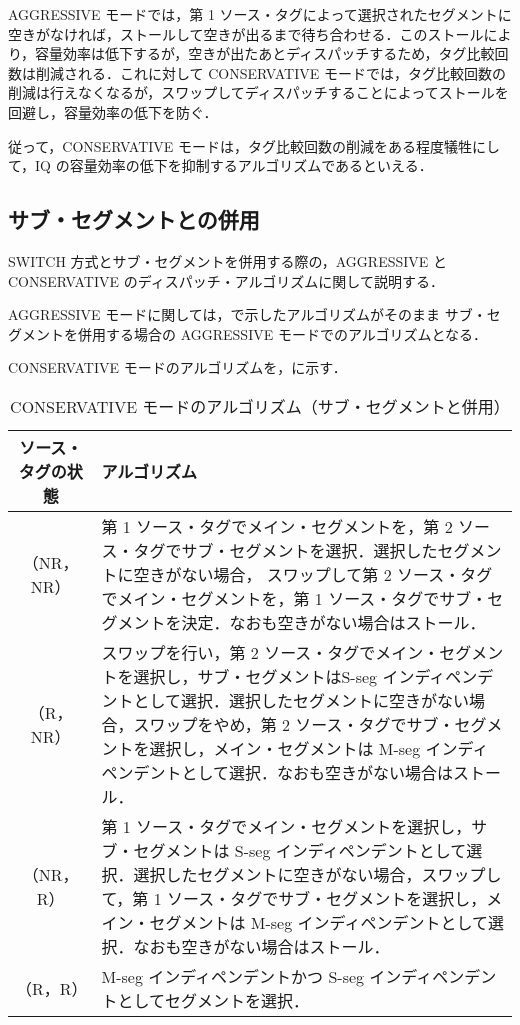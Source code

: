 AGGRESSIVE モードでは，第 1 ソース・タグによって選択されたセグメントに空きがなければ，ストールして空きが出るまで待ち合わせる．このストールにより，容量効率は低下するが，空きが出たあとディスパッチするため，タグ比較回数は削減される．これに対して CONSERVATIVE モードでは，タグ比較回数の削減は行えなくなるが，スワップしてディスパッチすることによってストールを回避し，容量効率の低下を防ぐ．

従って，CONSERVATIVE モードは，タグ比較回数の削減をある程度犠牲にして，IQ の容量効率の低下を抑制するアルゴリズムであるといえる．

\subsection{サブ・セグメントとの併用}
SWITCH 方式とサブ・セグメントを併用する際の，AGGRESSIVE と CONSERVATIVE のディスパッチ・アルゴリズムに関して説明する．

AGGRESSIVE モードに関しては，で示したアルゴリズムがそのまま サブ・セグメントを併用する場合の AGGRESSIVE モードでのアルゴリズムとなる．

CONSERVATIVE モードのアルゴリズムを，に示す．
\begin{table}[htb]
  \caption{CONSERVATIVE モードのアルゴリズム（サブ・セグメントと併用）}
  \footnotesize
  \center
   \begin{tabular}{|c|p{13.5cm}|} \hline \hline
    ソース・タグの状態 & アルゴリズム \\ \hline
    （NR，NR） & 第 1 ソース・タグでメイン・セグメントを，第 2 ソース・タグでサブ・セグメントを選択．選択したセグメントに空きがない場合， スワップして第 2 ソース・タグでメイン・セグメントを，第 1 ソース・タグでサブ・セグメントを決定．なおも空きがない場合はストール． \\ \hline
    （R，NR） & スワップを行い，第 2 ソース・タグでメイン・セグメントを選択し，サブ・セグメントはS-seg インディペンデントとして選択．選択したセグメントに空きがない場合，スワップをやめ，第 2 ソース・タグでサブ・セグメントを選択し，メイン・セグメントは M-seg インディペンデントとして選択．なおも空きがない場合はストール．\\ \hline
    （NR，R） & 第 1 ソース・タグでメイン・セグメントを選択し，サブ・セグメントは S-seg インディペンデントとして選択．選択したセグメントに空きがない場合，スワップして，第 1 ソース・タグでサブ・セグメントを選択し，メイン・セグメントは M-seg インディペンデントとして選択．なおも空きがない場合はストール．\\ \hline
    （R，R） & M-seg インディペンデントかつ S-seg インディペンデントとしてセグメントを選択． \\ \hline
  \end{tabular}
  \label{tab:cons_algorithm_subseg}
\end{table}

